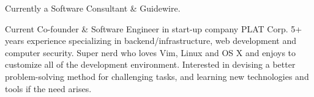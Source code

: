 

\begin{cvparagraph}


Currently a Software Consultant \& Guidewire. 

Current Co-founder \& Software Engineer in start-up company PLAT Corp. 5+ years experience specializing in backend/infrastructure, web development and computer security. Super nerd who loves Vim, Linux and OS X and enjoys to customize all of the development environment. Interested in devising a better problem-solving method for challenging tasks, and learning new technologies and tools if the need arises.
\end{cvparagraph}
